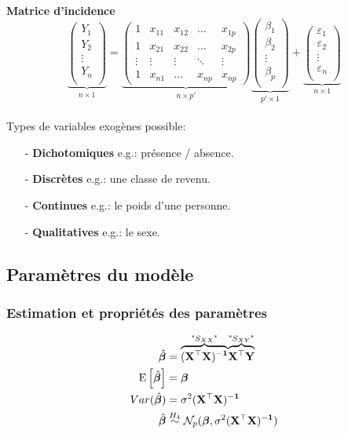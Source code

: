 \documentclass[10pt, french]{article}
\begin{document}
\begin{multicols*}{3}
\textbf{Matrice d'incidence}\\
\[
\underset{n\times 1}{\underbrace{\begin{pmatrix}
Y_1\\ 
Y_2\\ 
\vdots\\ 
Y_n\\ 
\end{pmatrix}
}}
=
\underset{n\times p'}{\underbrace{\begin{pmatrix}
1 & x_{11} & x_{12} & \dots & x_{1p} \\ 
1 & x_{21} & x_{22} & \dots  & x_{2p} \\ 
\vdots & \vdots & \vdots  & \ddots & \vdots \\ 
1 & x_{n1}  & \dots & x_{np} & x_{np}
\end{pmatrix}}}
\underset{p'\times 1}{\underbrace{\begin{pmatrix}
\beta_1\\ 
\beta_2\\ 
\vdots\\ 
\beta_p\\ 
\end{pmatrix}}}
+
\underset{n\times 1}{\underbrace{\begin{pmatrix}
\varepsilon_1\\ 
\varepsilon_2\\ 
\vdots\\ 
\varepsilon_n\\ 
\end{pmatrix}}}
\]
\\
Types de variables exogènes possible:
\begin{enumerate}
	\item[ - ] \textbf{Dichotomiques} e.g.: présence / absence.
	\item[ - ] \textbf{Discrètes} e.g.: une classe de revenu.
	\item[ - ] \textbf{Continues} e.g.: le poids d'une personne.
	\item[ - ] \textbf{Qualitatives}	e.g.: le sexe.
\end{enumerate}



\subsection*{Paramètres du modèle}
\subsubsection*{Estimation et propriétés des paramètres}
\begin{align*}
\hat{\bm{\beta}} &= \overset{\text{"}S_{XX}\text{"}}{\overbrace{(\mathbf{X^\top X)^{-1}}}} \overset{\text{"}S_{XY}\text{"}}{\overbrace{\mathbf{X^\top Y}}} \\
\mathrm{E} \left[ \hat{\bm{\beta}} \right]	&= \bm{\beta} \quad \\ Var(\hat{\bm{\beta}}) &= \sigma^2 (\mathbf{X^\top X)^{-1}} \\
\hat{\bm{\beta}} &\overset{H_4}{\sim} \mathcal{N}_p(\bm{\beta}, \sigma^2 (\mathbf{X^\top X)^{-1}})
\end{align*}


\end{multicols*}
\end{document}
